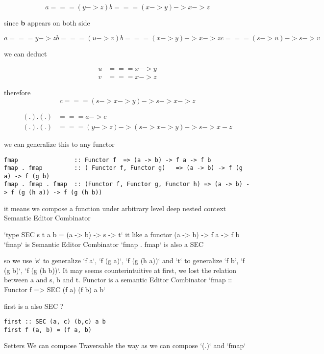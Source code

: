 \begin{equation}
a === (y -> z)
b === (x -> y) -> x -> z
\end{equation}

since \textbf{b} appears on both side

\begin{equation}
a === y -> z
b === (u -> v)
b === (x -> y) -> x -> z
c === (s -> u) -> s -> v
\end{equation}

we can deduct

\begin{align*}
u &=== x -> y  \\
v &=== x -> z
\end{align*}

therefore \begin{equation}c === (s -> x -> y) -> s -> x -> z\end{equation}

\begin{align*}
(.).(.) & === a -> c \\
(.).(.) & === (y -> z) -> (s -> x -> y) -> s -> x - z
\end{align*}


we can generalize this to any functor

\begin{verbatim}
fmap                :: Functor f  => (a -> b) -> f a -> f b
fmap . fmap         :: ( Functor f, Functor g)   => (a -> b) -> f (g a) -> f (g b)
fmap . fmap . fmap  :: (Functor f, Functor g, Functor h) => (a -> b) -> f (g (h a)) -> f (g (h b))
\end{verbatim}

it means we compose a function under arbitrary level deep nested context
Semantic Editor Combinator

`type SEC s t a b = (a -> b) -> s -> t`
it like a functor (a -> b) -> f a -> f b
`fmap` is Semantic Editor Combinator
`fmap . fmap` is also a SEC

so we use `s` to generalize `f a`,  `f (g a)`, `f (g (h a))` and `t` to generalize `f b`,  `f (g b)`, `f (g (h b))`.
It may seems counterintuitive at first, we lost the relation between a and s, b and t.
Functor is a semantic Editor Combinator
`fmap :: Functor f => SEC (f a) (f b) a b`

first is a also SEC ?
\begin{verbatim}
first :: SEC (a, c) (b,c) a b
first f (a, b) = (f a, b)
\end{verbatim}
Setters
We can compose Traversable the way as we can compose `(.)` and `fmap`

